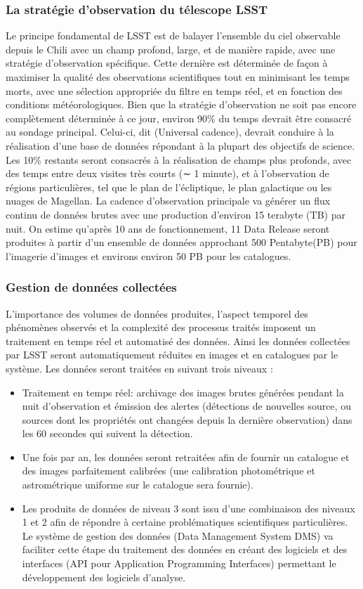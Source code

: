 \subsubsection{La stratégie d'observation du télescope LSST}
Le principe fondamental de LSST est de balayer l'ensemble du ciel observable depuis le Chili avec un champ profond, large, et de manière rapide, avec une stratégie d'observation spécifique. Cette dernière est déterminée de façon à maximiser la qualité des observations scientifiques tout en minimisant les temps morts, avec une sélection appropriée du filtre en temps réel, et en fonction des conditions météorologiques. Bien que la stratégie d'observation ne soit pas encore complètement déterminée à ce jour, environ 90\% du temps devrait être consacré au sondage principal. Celui-ci, dit (Universal cadence), devrait conduire à la réalisation d’une base de données répondant à la plupart des objectifs de science.  Les 10\% restants seront consacrés à la réalisation de champs plus profonds, avec des temps entre deux visites très courts (∼ 1 minute), et à l'observation de régions particulières, tel que le plan de l'écliptique, le plan galactique ou les nuages de Magellan.
La cadence d'observation principale va générer un flux continu de données brutes avec une production d'environ 15 terabyte (TB) par nuit. On estime qu'après 10 ans de fonctionnement, 11 Data Release seront produites à partir d'un ensemble de données approchant 500 Pentabyte(PB) pour l'imagerie d'images et environs environ 50 PB pour les catalogues.
\subsubsection{Gestion de données collectées}
L'importance des volumes de données produites, l'aspect temporel des phénomènes observés et la complexité des processus traités imposent un traitement en temps réel et automatisé des données. Ainsi les données collectées par LSST seront automatiquement réduites en images et en catalogues par le système. Les données seront traitées en suivant trois niveaux :
\begin{itemize}
    \item Traitement en temps réel: archivage des images brutes générées pendant la nuit d'observation et émission des alertes (détections de nouvelles source, ou sources dont les propriétés ont changées depuis la dernière observation) dans les 60 secondes qui suivent la détection.
    \item Une fois par an, les données seront retraitées afin de fournir un catalogue et des images parfaitement calibrées (une calibration photométrique et astrométrique uniforme sur le catalogue sera fournie).
    \item Les produits de données de niveau 3 sont issu d'une combinaison des niveaux 1 et 2 afin de répondre à certaine problématiques scientifiques particulières. Le système de gestion des données (Data Management System DMS) va faciliter cette étape du traitement des données en créant des logiciels et des interfaces (API pour Application Programming Interfaces) permettant le développement des logiciels d'analyse.
\end{itemize}

